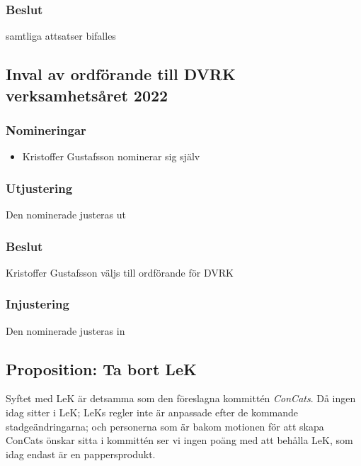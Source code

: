 \documentclass[protokoll]{dvd}
\begin{document}
\subsubsection*{Beslut}
    \begin{attsatser}
        \item samtliga attsatser bifalles
    \end{attsatser}




\subsection{Inval av ordförande till DVRK verksamhetsåret 2022}

    \subsubsection*{Nomineringar}

        \begin{itemize}
            \item  Kristoffer Gustafsson nominerar sig själv
        \end{itemize}

        \subsubsection*{Utjustering}
        Den nominerade justeras ut

        \subsubsection*{Beslut}
            \begin{attsatser}
                \item Kristoffer Gustafsson väljs till ordförande för DVRK
            \end{attsatser}

        \subsubsection*{Injustering}
        Den nominerade justeras in

\newpage

\subsection{Proposition: Ta bort LeK}

Syftet med LeK är detsamma som den föreslagna kommittén \emph{ConCats}.
Då ingen idag sitter i LeK; LeKs regler inte är anpassade efter de kommande stadgeändringarna; och personerna som är bakom motionen för att skapa ConCats önskar sitta i kommittén ser vi ingen poäng med att behålla LeK, som idag endast är en pappersprodukt.
\end{document}
